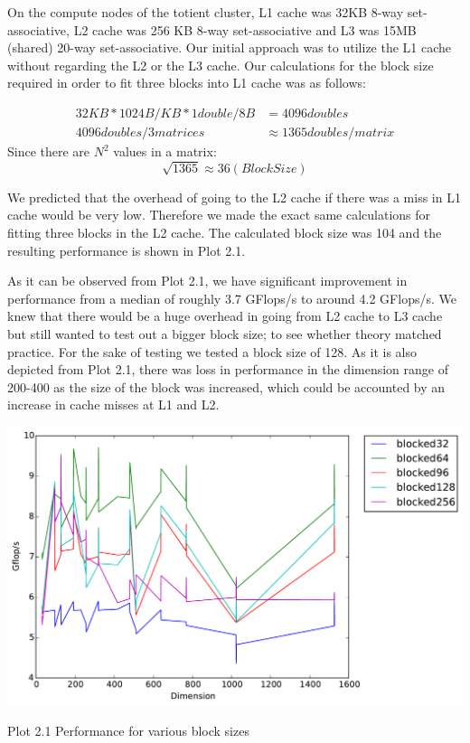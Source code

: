 \documentclass[12pt]{article}
\begin{document}
On the compute nodes of the totient cluster, L1 cache was 32KB 8-way set-associative, L2 cache was 256 KB 8-way set-associative and L3 was 15MB (shared) 20-way set-associative. Our initial approach was to utilize the L1 cache without regarding the L2 or the L3 cache. Our calculations for the block size required in order to fit three blocks into L1 cache was as follows:

\begin{align*}
32KB * 1024B/KB * 1 double/8B &= 4096 doubles\\
4096 doubles / 3 matrices &\approx 1365 doubles/matrix
\end{align*}
Since there are $N^2$ values in a matrix: \[\sqrt{1365}\approx 36 (Block Size)\]



We predicted that the overhead of going to the L2 cache if there was a miss in L1 cache would be very low. Therefore we made the exact same calculations for fitting three blocks in the L2 cache. The calculated block size was 104 and the resulting performance is shown in Plot 2.1.

As it can be observed from Plot 2.1, we have significant improvement in performance from a median of roughly 3.7 GFlops/s to around 4.2 GFlops/s. We knew that there would be a huge overhead in going from L2 cache to L3 cache but still wanted to test out a bigger block size; to see whether theory matched practice. For the sake of testing we tested a block size of 128. As it is also depicted from Plot 2.1, there was loss in performance in the dimension range of 200-400 as the size of the block was increased, which could be accounted by an increase in cache misses at L1 and L2.


\begin{center}
\includegraphics[width=16cm]{timing_blocked_comparison.pdf}

Plot 2.1 Performance for various block sizes
\end{center}
\end{document}
